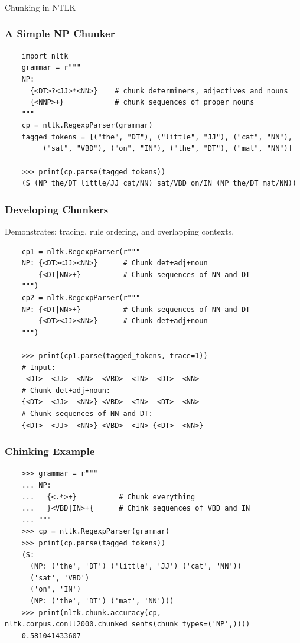 \begin{frame}[fragile]\frametitle{}

\begin{center}
{\Large Chunking in NTLK}
\end{center}
\end{frame}

\begin{frame}[fragile]\frametitle{A Simple NP Chunker}
  \scriptsize

\begin{lstlisting}
    import nltk
    grammar = r"""
    NP:
      {<DT>?<JJ>*<NN>}    # chunk determiners, adjectives and nouns
      {<NNP>+}            # chunk sequences of proper nouns
    """
    cp = nltk.RegexpParser(grammar)
    tagged_tokens = [("the", "DT"), ("little", "JJ"), ("cat", "NN"),
         ("sat", "VBD"), ("on", "IN"), ("the", "DT"), ("mat", "NN")]

    >>> print(cp.parse(tagged_tokens))
    (S (NP the/DT little/JJ cat/NN) sat/VBD on/IN (NP the/DT mat/NN))
\end{lstlisting}
\end{frame}

\begin{frame}[fragile]\frametitle{Developing Chunkers}
  \tiny
Demonstrates: tracing, rule ordering, and overlapping contexts.
\begin{lstlisting}
    cp1 = nltk.RegexpParser(r"""
    NP: {<DT><JJ><NN>}      # Chunk det+adj+noun
        {<DT|NN>+}          # Chunk sequences of NN and DT
    """)
    cp2 = nltk.RegexpParser(r"""
    NP: {<DT|NN>+}          # Chunk sequences of NN and DT
        {<DT><JJ><NN>}      # Chunk det+adj+noun
    """)
    
    >>> print(cp1.parse(tagged_tokens, trace=1))
    # Input:
     <DT>  <JJ>  <NN>  <VBD>  <IN>  <DT>  <NN> 
    # Chunk det+adj+noun:
    {<DT>  <JJ>  <NN>} <VBD>  <IN>  <DT>  <NN> 
    # Chunk sequences of NN and DT:
    {<DT>  <JJ>  <NN>} <VBD>  <IN> {<DT>  <NN>}
\end{lstlisting}
\end{frame}

\begin{frame}[fragile]
  \frametitle{Chinking Example}
  \scriptsize

\begin{lstlisting}
    >>> grammar = r"""
    ... NP:
    ...   {<.*>+}          # Chunk everything
    ...   }<VBD|IN>+{      # Chink sequences of VBD and IN
    ... """
    >>> cp = nltk.RegexpParser(grammar)
    >>> print(cp.parse(tagged_tokens))
    (S:
      (NP: ('the', 'DT') ('little', 'JJ') ('cat', 'NN'))
      ('sat', 'VBD')
      ('on', 'IN')
      (NP: ('the', 'DT') ('mat', 'NN')))
    >>> print(nltk.chunk.accuracy(cp, nltk.corpus.conll2000.chunked_sents(chunk_types=('NP',))))
    0.581041433607
\end{lstlisting}
\end{frame}


